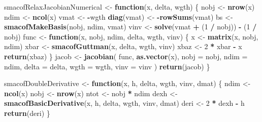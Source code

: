 \documentclass[
  12pt,
]{article}
\newenvironment{Shaded}{\begin{snugshade}}{\end{snugshade}}
\newcommand{\AttributeTok}[1]{\textcolor[rgb]{0.13,0.29,0.53}{#1}}
\newcommand{\ControlFlowTok}[1]{\textcolor[rgb]{0.13,0.29,0.53}{\textbf{#1}}}
\newcommand{\DecValTok}[1]{\textcolor[rgb]{0.00,0.00,0.81}{#1}}
\newcommand{\FunctionTok}[1]{\textcolor[rgb]{0.13,0.29,0.53}{\textbf{#1}}}
\newcommand{\NormalTok}[1]{#1}
\newcommand{\OtherTok}[1]{\textcolor[rgb]{0.56,0.35,0.01}{#1}}
\newcommand{\SpecialCharTok}[1]{\textcolor[rgb]{0.81,0.36,0.00}{\textbf{#1}}}
\begin{document}
\begin{Shaded}
\begin{Highlighting}[]
\NormalTok{smacofRelaxJacobianNumerical }\OtherTok{\textless{}{-}} \ControlFlowTok{function}\NormalTok{(x, delta, wgth) \{}
\NormalTok{  nobj }\OtherTok{\textless{}{-}} \FunctionTok{nrow}\NormalTok{(x)}
\NormalTok{  ndim }\OtherTok{\textless{}{-}} \FunctionTok{ncol}\NormalTok{(x)}
\NormalTok{  vmat }\OtherTok{\textless{}{-}} \SpecialCharTok{{-}}\NormalTok{wgth}
  \FunctionTok{diag}\NormalTok{(vmat) }\OtherTok{\textless{}{-}} \SpecialCharTok{{-}}\FunctionTok{rowSums}\NormalTok{(vmat)}
\NormalTok{  bs }\OtherTok{\textless{}{-}} \FunctionTok{smacofMakeBasis}\NormalTok{(nobj, ndim, vmat)}
\NormalTok{  vinv }\OtherTok{\textless{}{-}} \FunctionTok{solve}\NormalTok{(vmat }\SpecialCharTok{+}\NormalTok{ (}\DecValTok{1} \SpecialCharTok{/}\NormalTok{ nobj)) }\SpecialCharTok{{-}}\NormalTok{ (}\DecValTok{1} \SpecialCharTok{/}\NormalTok{ nobj)}
\NormalTok{  func }\OtherTok{\textless{}{-}} \ControlFlowTok{function}\NormalTok{(x, nobj, ndim, delta, wgth, vinv) \{}
\NormalTok{    x }\OtherTok{\textless{}{-}} \FunctionTok{matrix}\NormalTok{(x, nobj, ndim)}
\NormalTok{    xbar }\OtherTok{\textless{}{-}} \FunctionTok{smacofGuttman}\NormalTok{(x, delta, wgth, vinv)}
\NormalTok{    xbaz }\OtherTok{\textless{}{-}} \DecValTok{2} \SpecialCharTok{*}\NormalTok{ xbar }\SpecialCharTok{{-}}\NormalTok{ x}
    \FunctionTok{return}\NormalTok{(xbaz)}
\NormalTok{  \}}
\NormalTok{  jacob }\OtherTok{\textless{}{-}} \FunctionTok{jacobian}\NormalTok{(}
\NormalTok{    func,}
    \FunctionTok{as.vector}\NormalTok{(x),}
    \AttributeTok{nobj =}\NormalTok{ nobj,}
    \AttributeTok{ndim =}\NormalTok{ ndim,}
    \AttributeTok{delta =}\NormalTok{ delta,}
    \AttributeTok{wgth =}\NormalTok{ wgth,}
    \AttributeTok{vinv =}\NormalTok{ vinv}
\NormalTok{  )}
  \FunctionTok{return}\NormalTok{(jacob)}
\NormalTok{\}}

\NormalTok{smacofDoubleDerivative }\OtherTok{\textless{}{-}} \ControlFlowTok{function}\NormalTok{(x, h, delta, wgth, vinv, dmat) \{}
\NormalTok{  ndim }\OtherTok{\textless{}{-}} \FunctionTok{ncol}\NormalTok{(x)}
\NormalTok{  nobj }\OtherTok{\textless{}{-}} \FunctionTok{nrow}\NormalTok{(x)}
\NormalTok{  ntot }\OtherTok{\textless{}{-}}\NormalTok{ nobj }\SpecialCharTok{*}\NormalTok{ ndim}
\NormalTok{  dexh }\OtherTok{\textless{}{-}} \FunctionTok{smacofBasicDerivative}\NormalTok{(x, h, delta, wgth, vinv, dmat)}
\NormalTok{  deri }\OtherTok{\textless{}{-}} \DecValTok{2} \SpecialCharTok{*}\NormalTok{ dexh }\SpecialCharTok{{-}}\NormalTok{ h}
  \FunctionTok{return}\NormalTok{(deri)}
\NormalTok{\}}


\end{Highlighting}
\end{Shaded}
\end{document}

